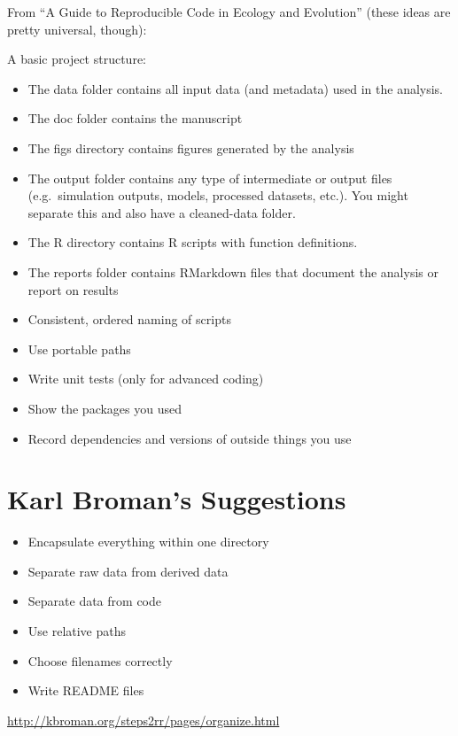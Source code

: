 \documentclass[12pt]{article}
\providecommand{\tightlist}{%
  \setlength{\itemsep}{0pt}\setlength{\parskip}{0pt}}
\begin{document}
From ``A Guide to Reproducible Code in Ecology and Evolution'' (these
ideas are pretty universal, though):

A basic project structure:

\begin{itemize}
\item
  The data folder contains all input data (and metadata) used in the
  analysis.
\item
  The doc folder contains the manuscript
\item
  The figs directory contains figures generated by the analysis
\item
  The output folder contains any type of intermediate or output files
  (e.g.~simulation outputs, models, processed datasets, etc.). You might
  separate this and also have a cleaned-data folder.
\item
  The R directory contains R scripts with function definitions.
\item
  The reports folder contains RMarkdown files that document the analysis
  or report on results
\item
  Consistent, ordered naming of scripts
\item
  Use portable paths
\item
  Write unit tests (only for advanced coding)
\item
  Show the packages you used
\item
  Record dependencies and versions of outside things you use
\end{itemize}

\citet{cooper2017guide}

\section{Karl Broman's Suggestions}\label{karl-bromans-suggestions}

\begin{itemize}
\tightlist
\item
  Encapsulate everything within one directory
\item
  Separate raw data from derived data
\item
  Separate data from code
\item
  Use relative paths
\item
  Choose filenames correctly
\item
  Write README files
\end{itemize}

\url{http://kbroman.org/steps2rr/pages/organize.html}
\end{document}
